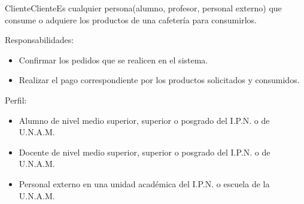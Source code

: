 	\begin{Actor}{Cliente}{Cliente}{Es cualquier persona(alumno, profesor, personal externo) que consume o adquiere los productos de una cafetería para consumirlos.}
	
	\item[Responsabilidades:]\hspace{1pt}
		\begin{itemize}
		\item Confirmar los pedidos que se realicen en el sistema.
		\item Realizar el pago correspondiente por los productos solicitados y consumidos.
		\end{itemize}
	\item[Perfil:]\hspace{1pt}
		\begin{itemize}
			\item Alumno de nivel medio superior, superior o posgrado del I.P.N. o de U.N.A.M.
			\item Docente de nivel medio superior, superior o posgrado del I.P.N. o de U.N.A.M.
			\item Personal externo en una unidad académica del I.P.N. o escuela de la U.N.A.M.
		\end{itemize}
	\end{Actor}